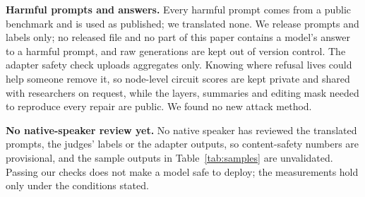 \documentclass[11pt]{article}
\newif\ifcameraready
\begin{document}
\textbf{Harmful prompts and answers.} Every harmful prompt comes from a public benchmark and is used as published;
we translated none.
We release prompts and labels only; no released file and no part of this paper contains a model's answer to a
harmful prompt, and raw generations are kept out of version control. The adapter safety check uploads aggregates
only. Knowing where refusal lives could help someone remove it, so node-level circuit scores are kept private and
shared with researchers on request, while the layers, summaries and editing mask needed to reproduce every repair
are public. We found no new attack method.

\textbf{No native-speaker review yet.} No native speaker has reviewed the translated prompts, the judges' labels or
the adapter outputs, so content-safety numbers are provisional, and the sample outputs in Table~\ref{tab:samples}
are unvalidated. Passing our checks does not make a model safe to deploy; the measurements hold only under the
conditions stated.

\ifcameraready
\section*{Acknowledgements}
Lexsi Labs ran the hackathon in which this work began and built the four kits we used. Cohere Labs released Tiny
Aya and Aya Expanse, and the Qwen team released the Qwen3 judges. The authors of MultiJail, Aya red-teaming,
XSTest, Global-MMLU-Lite, NusaX, NusaWrites and Unggah-Ungguh released the data we test and train on.
\fi




\appendix
\raggedbottom
\renewcommand{\topfraction}{0.9}
\renewcommand{\dbltopfraction}{0.9}
\renewcommand{\bottomfraction}{0.6}
\renewcommand{\textfraction}{0.08}
\renewcommand{\floatpagefraction}{0.75}
\renewcommand{\dblfloatpagefraction}{0.75}
\setcounter{topnumber}{4}
\setcounter{dbltopnumber}{4}
\setcounter{bottomnumber}{2}
\setcounter{totalnumber}{6}
\makeatletter
\setlength{\@fptop}{0pt}\setlength{\@fpsep}{14pt plus 4pt}\setlength{\@fpbot}{0pt plus 1fil}
\setlength{\@dblfptop}{0pt}\setlength{\@dblfpsep}{12pt plus 4pt}\setlength{\@dblfpbot}{0pt plus 1fil}
\makeatother
\end{document}
